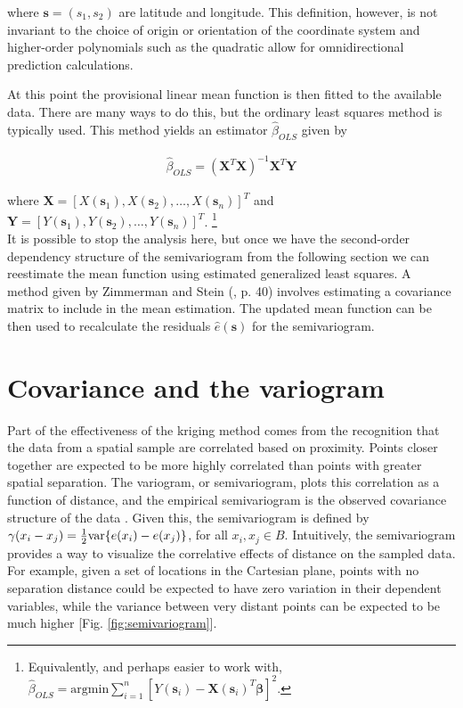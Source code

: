 \documentclass[12pt,twoside]{reedthesis}
\begin{document}
where $\mathbf{s} = (s_1, s_2)$ are latitude and longitude. This definition, however, is not invariant to the choice of origin or orientation of the coordinate system \cite{gelfand:2010} and higher-order polynomials such as the quadratic allow for omnidirectional prediction calculations.


At this point the provisional linear mean function is then fitted to the available data. There are many ways to do this, but the ordinary least squares method is typically used. This method yields an estimator $\hat\beta_{OLS}$ given by 

\begin{align*}
\hat\beta_{OLS} = (\mathbf{X}^T\mathbf{X})^{-1}\mathbf{X}^T\mathbf{Y} 
\end{align*} 

where $\mathbf{X} = [X(\mathbf{s}_1), X(\mathbf{s}_2), \dots, X(\mathbf{s}_n)]^T$ and $\mathbf{Y} = [Y(\mathbf{s}_1), Y(\mathbf{s}_2), \dots, Y(\mathbf{s}_n)]^T$. \footnote{Equivalently, and perhaps easier to work with, $\hat\beta_{OLS} = \text{argmin}\sum_{i=1}^n[Y(\mathbf{s}_i) - \mathbf{X}(\mathbf{s}_i)^T\mathbf{\beta}]^2$.} \\

It is possible to stop the analysis here, but once we have the second-order dependency structure of the semivariogram from the following section we can reestimate the mean function using estimated generalized least squares. A method given by Zimmerman and Stein (\cite{gelfand:2010}, p. 40) involves estimating a covariance matrix to include in the mean estimation. The updated mean function can be then used to recalculate the residuals $\hat e(\mathbf{s})$ for the semivariogram.


\section{Covariance and the variogram}
Part of the effectiveness of the kriging method comes from the recognition that the data from a spatial sample are correlated based on proximity. Points closer together are expected to be more highly correlated than points with greater spatial separation. The variogram, or semivariogram, plots this correlation as a function of distance, and the empirical semivariogram is the observed covariance structure of the data \cite{gelfand:2010}. Given this, the semivariogram is defined by $\gamma(x_i - x_j) = {1\over 2} \text{var} \{ e(x_i) - e(x_j) \}$, for all $x_i, x_j \in B$. Intuitively, the semivariogram provides a way to visualize the correlative effects of distance on the sampled data. For example, given a set of locations in the Cartesian plane, points with no separation distance could be expected to have zero variation in their dependent variables, while the variance between very distant points can be expected to be much higher [Fig. \ref{fig:semivariogram}]. \\
\end{document}

